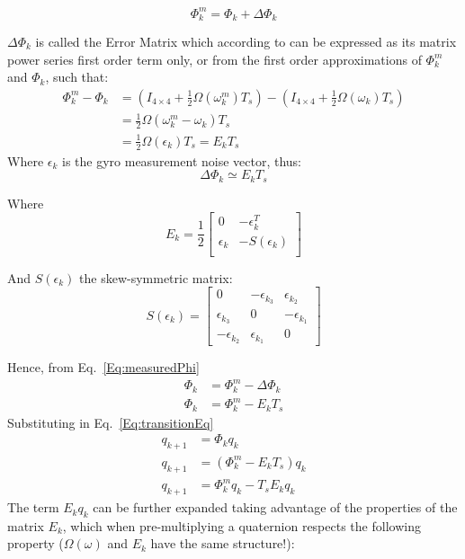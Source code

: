 \documentclass[12pt,a4paper,twoside]{article}
\begin{document}
  \begin{equation}
   \Phi^m_k = \Phi_k + \Delta\Phi_k
   \label{Eq:measuredPhi}
  \end{equation}

  $\Delta\Phi_k$ is called the Error Matrix which according to  can be expressed as its matrix power series first order term only, or from the first order approximations of $\Phi^m_k$ and $\Phi_k$, such that:
  \begin{align}
   \Phi^m_k - \Phi_k &= (I_{4\times4} + \frac{1}{2}\Omega(\omega^m_k)T_s) - (I_{4\times4} + \frac{1}{2}\Omega({\omega_k})T_s) \\
                     &= \frac{1}{2}\Omega(\omega^m_k - \omega_k)T_s \\
                     &= \frac{1}{2}\Omega(\epsilon_k)T_s = E_k T_s
  \end{align}
  Where $\epsilon_k$ is the gyro measurement noise vector, thus:
  \begin{equation}
   \Delta{\Phi_k} \simeq E_k T_s
  \end{equation}

  Where
  \begin{equation}
  E_k = \frac{1}{2}\left[ \begin{array}{cc}
                           0      & -\epsilon^T_k  \\
                           \epsilon_k & -S(\epsilon_k) \\
                          \end{array}  \right]
  \end{equation}

  And $S(\epsilon_k)$ the skew-symmetric matrix:
  \begin{equation}
    S(\epsilon_k) = \left[ \begin{array}{ccc}
                                0       &  -\epsilon_{k_3} & \epsilon_{k_2}  \\
                          \epsilon_{k_3}  &        0       & -\epsilon_{k_1} \\
                          -\epsilon_{k_2} &   \epsilon_{k_1} &       0
                         \end{array} \right]
  \end{equation}

  Hence, from Eq.~\ref{Eq:measuredPhi}
  \begin{align}
   \Phi_k &= \Phi^m_k - \Delta \Phi_k \\
   \Phi_k &= \Phi^m_k - E_k T_s
  \end{align}
  Substituting in Eq.~\ref{Eq:transitionEq}
  \begin{align}
   q_{k+1} &= \Phi_k q_k \\
   q_{k+1} &= (\Phi^m_k - E_k T_s)q_k \\
   q_{k+1} &= \Phi^m_k q_k - T_s E_k q_k \label{Eq:transitionEq2}
  \end{align}
The term $E_k q_k$ can be further expanded taking advantage of the properties of the matrix $E_k$, which when pre-multiplying a quaternion respects the following property ($\Omega(\omega)$ and $E_k$ have the same structure!):
\end{document}

